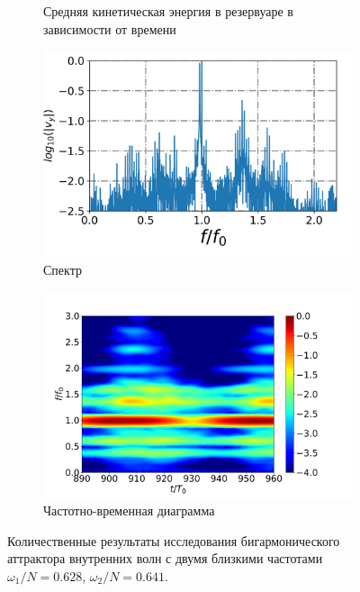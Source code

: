 \begin{figure}
\begin{subfigure}[с]{0.45\textwidth}
    \caption{Средняя кинетическая энергия в резервуаре в зависимости от времени}
  \end{subfigure}
  \par
  \begin{subfigure}[с]{0.45\textwidth}
    \includegraphics[width=1\textwidth]{pics/H40L60N1ap05dp20w1p63Deltawp02Biharm/spectrumX35p6Y11p2.png}
    \caption{Спектр}
  \end{subfigure}
  \begin{subfigure}[с]{0.45\textwidth}
    \includegraphics[width=1\textwidth]{pics/H40L60N1ap05dp20w1p63Deltawp02Biharm/TFspectrumX35p6Y11p2N256.png}
    \caption{Частотно-временная диаграмма}
  \end{subfigure}
  \caption{Количественные результаты исследования бигармонического аттрактора внутренних волн с двумя близкими частотами $\omega_1/N=0.628$,  $\omega_2/N=0.641$.}
  \label{fig:biharmVyap005-2}
\end{figure}

